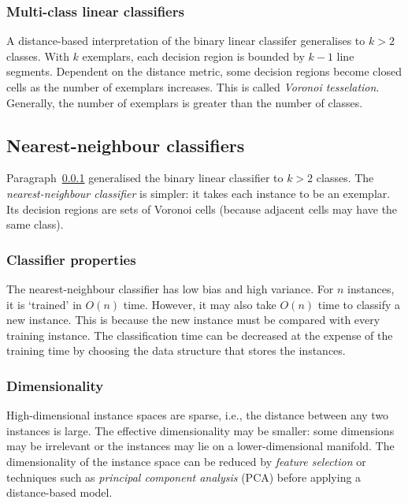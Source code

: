 \subsubsection{Multi-class linear classifiers}
\label{par:8:multi-class-linear-classifiers}

A distance-based interpretation of the binary linear classifer generalises to
$k > 2$ classes.
With $k$ exemplars, each decision region is bounded by $k - 1$ line segments.
Dependent on the distance metric, some decision regions become closed cells as
the number of exemplars increases.
This is called \textit{Voronoi tesselation}.
Generally, the number of exemplars is greater than the number of classes.

\subsection{Nearest-neighbour classifiers}

Paragraph~\ref{par:8:multi-class-linear-classifiers} generalised the binary
linear classifier to $k > 2$ classes.
The \textit{nearest-neighbour classifier} is simpler: it takes each instance to
be an exemplar.
Its decision regions are sets of Voronoi cells (because adjacent cells may have
the same class).

\subsubsection{Classifier properties}

The nearest-neighbour classifier has low bias and high variance.
For $n$ instances, it is `trained' in $O(n)$ time.
However, it may also take $O(n)$ time to classify a new instance.
This is because the new instance must be compared with every training instance.
The classification time can be decreased at the expense of the training time by
choosing the data structure that stores the instances.

\subsubsection{Dimensionality}

High-dimensional instance spaces are sparse, i.e., the distance between any two
instances is large.
The effective dimensionality may be smaller: some dimensions may be irrelevant
or the instances may lie on a lower-dimensional manifold.
The dimensionality of the instance space can be reduced by \textit{feature
  selection} or techniques such as \textit{principal component analysis} (PCA)
before applying a distance-based model.

